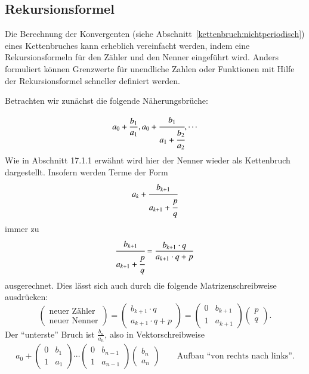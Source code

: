 \subsection{Rekursionsformel}
Die Berechnung der Konvergenten (siehe
Abschnitt~\ref{kettenbruch:nichtperiodisch}) eines Kettenbruches 
kann erheblich vereinfacht werden, indem eine Rekursionsformeln für den Zähler 
und den Nenner eingeführt wird.
Anders formuliert können Grenzwerte für unendliche 
Zahlen oder Funktionen mit Hilfe der Rekursionsformel schneller definiert
werden.

Betrachten wir zunächst die folgende Näherungsbrüche:

\begin{align*}
a_0 + \frac{b_1}{a_1} , a_0 + \cfrac{b_1}{a_1 + \cfrac{b_2}{a_2}} , \cdots
\end{align*}
Wie in Abschnitt 17.1.1 erwähnt wird hier der Nenner wieder als Kettenbruch dargestellt.
Insofern  werden Terme der Form
\begin{align*}
a_k + \cfrac{b_{k + 1}}{a_{k + 1} + \cfrac{p}{q}}
\end{align*}
immer zu
\begin{align*}
\cfrac{b_{k+1}}{a_{k+1} + \cfrac{p}{q}} = \frac{b_{k+1} \cdot q}{a_{k+1} \cdot q + p}
\end{align*}
ausgerechnet.
Dies lässt sich auch durch die folgende Matrizenschreibweise ausdrücken:
\begin{equation}
		\begin{pmatrix}
			\textrm{neuer Zähler}\\
			\textrm{neuer Nenner}
		\end{pmatrix}
 = 		\begin{pmatrix}
			b_{k+1} \cdot q\\
			a_{k+1} \cdot q + p
		\end{pmatrix}
		=\begin{pmatrix}
			0&	b_{k+1}\\
			1&	a_{k+1}
		\end{pmatrix}
		\begin{pmatrix}
		p \\
		q
		\end{pmatrix}.
\label{kettenbruch:section:Rekursionsformel}
\end{equation}
Der ``unterste'' Bruch ist $\frac{b_n}{a_n}$, also in Vektorschreibweise
\begin{align*}
a_0 + 	\begin{pmatrix}
			0& b_1\\
			1& a_1
		\end{pmatrix}
		\cdots
		\begin{pmatrix}
			0& b_{n-1}\\
			1& a_{n-1}
		\end{pmatrix}
		\begin{pmatrix}
			b_n\\
			a_n
		\end{pmatrix}
\qquad\textrm{Aufbau ``von rechts nach links''.}
\end{align*}

